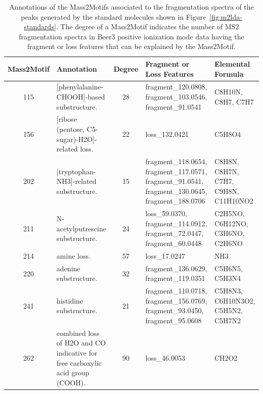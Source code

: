 \begin{table}
\small
\begin{centering}
\begin{tabular}{| c | p{4cm} | c | p{3.5cm} | p{2.5cm} |}
\hline 
Mass2Motif & Annotation & Degree & Fragment or Loss Features & Elemental Formula\tabularnewline
\hline 
\hline 
115 & {[}phenylalanine-CHOOH{]}-based substructure.  & 28 & fragment\_120.0808, fragment\_103.0546, fragment\_91.0541 & C8H10N, \newline C8H7, \newline C7H7\tabularnewline
\hline 
156 & {[}ribose (pentose, C5-sugar)-H2O{]}-related loss.  & 22 & loss\_132.0421 & C5H8O4 \tabularnewline
\hline 
202 & {[}tryptophan-NH3{]}-related substructure.  & 15 & fragment\_118.0654, 
fragment\_117.0571, 
fragment\_91.0541, 
fragment\_130.0645,
fragment\_188.0706 & C8H8N, \newline
C8H7N, \newline
C7H7, \newline
C9H8N, \newline
C11H10NO2\tabularnewline
\hline 
211 & N-acetylputrescine substructure.  & 24 & loss\_59.0370, \newline
fragment\_114.0912, 
fragment\_72.0447, 
fragment\_60.0448 & C2H5NO, 
C6H12NO, C3H6NO, 
C2H6NO\tabularnewline
\hline 
214 & amine loss.  & 57 & loss\_17.0247  & NH3\tabularnewline
\hline 
220 & adenine substructure.  & 32 & fragment\_136.0629, 
fragment\_119.0351 & C5H6N5, 
C5H3N4\tabularnewline
\hline 
241 & histidine substructure.  & 21 & fragment\_110.0718, 
fragment\_156.0769, 
fragment\_93.0450, 
fragment\_95.0608 & C5H8N3, 
C6H10N3O2, 
C5H5N2, 
C5H7N2\tabularnewline
\hline 
262 & combined loss of H2O and CO \textendash{} indicative for free carboxylic
acid group (COOH).  & 90 & loss\_46.0053  & CH2O2 \tabularnewline
\hline 
\end{tabular}
\par\end{centering}
\caption[Annotations of the Mass2Motifs associated to the fragmentation spectra
of the peaks generated by the standard molecules shown in Figure~\ref{fig:m2lda-standards}.]{Annotations of the Mass2Motifs associated to the fragmentation spectra
of the peaks generated by the standard molecules shown in Figure~\ref{fig:m2lda-standards}. The degree of
a Mass2Motif indicates the number of MS2 fragmentation spectra in
Beer3 positive ionization mode data having the fragment or loss features
that can be explained by the Mass2Motif. \label{tab:ms2lda-standards}}
\end{table}

